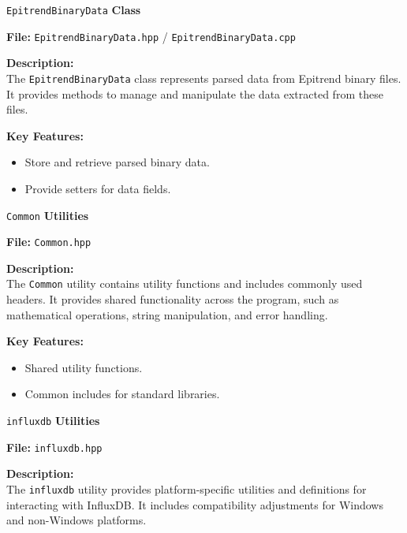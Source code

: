 \documentclass{article}
\begin{document}
\vspace{15pt}
\noindent
\texttt{EpitrendBinaryData} \textbf{Class}

\vspace{5pt}
\noindent
\textbf{File:} \texttt{EpitrendBinaryData.hpp} / \texttt{EpitrendBinaryData.cpp} 

\vspace{5pt}
\noindent
\textbf{Description:}
\\
\noindent
The \texttt{EpitrendBinaryData} class represents parsed data from Epitrend binary files. It provides methods to manage and manipulate the data extracted from these files.

\vspace{5pt}
\noindent
\textbf{Key Features:}
\begin{itemize}
    \item Store and retrieve parsed binary data.
    \item Provide setters for data fields.
\end{itemize}

\vspace{15pt}
\noindent
\texttt{Common} \textbf{Utilities}

\vspace{5pt}
\noindent
\textbf{File:} \texttt{Common.hpp}

\vspace{5pt}
\noindent
\textbf{Description:}
\\
\noindent
The \texttt{Common} utility contains utility functions and includes commonly used headers. It provides shared functionality across the program, such as mathematical operations, string manipulation, and error handling.

\vspace{5pt}
\noindent
\textbf{Key Features:}
\begin{itemize}
    \item Shared utility functions.
    \item Common includes for standard libraries.
\end{itemize}

\vspace{15pt}
\noindent
\texttt{influxdb} \textbf{Utilities}

\vspace{5pt}
\noindent
\textbf{File:} \texttt{influxdb.hpp}

\vspace{5pt}
\noindent
\textbf{Description:}
\\
\noindent
The \texttt{influxdb} utility provides platform-specific utilities and definitions for interacting with InfluxDB. It includes compatibility adjustments for Windows and non-Windows platforms.
\end{document}
